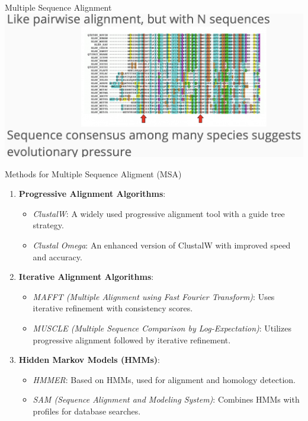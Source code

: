 \documentclass[
  ignorenonframetext,
]{beamer}
\providecommand{\tightlist}{%
  \setlength{\itemsep}{0pt}\setlength{\parskip}{0pt}}
\begin{document}
\begin{frame}{Multiple Sequence Alignment}
\label{multiple-sequence-alignment}
\includegraphics{figs/multiple_align.png}
\end{frame}

\begin{frame}{Methods for Multiple Sequence Aligment (MSA)}
\label{methods-for-multiple-sequence-aligment-msa}
\begin{enumerate}
\tightlist
\item
  \textbf{Progressive Alignment Algorithms}:

  \begin{itemize}
  \tightlist
  \item
    \emph{ClustalW}: A widely used progressive alignment tool with a
    guide tree strategy.
  \item
    \emph{Clustal Omega}: An enhanced version of ClustalW with improved
    speed and accuracy.
  \end{itemize}
\item
  \textbf{Iterative Alignment Algorithms}:

  \begin{itemize}
  \tightlist
  \item
    \emph{MAFFT (Multiple Alignment using Fast Fourier Transform)}: Uses
    iterative refinement with consistency scores.
  \item
    \emph{MUSCLE (Multiple Sequence Comparison by Log-Expectation)}:
    Utilizes progressive alignment followed by iterative refinement.
  \end{itemize}
\item
  \textbf{Hidden Markov Models (HMMs)}:

  \begin{itemize}
  \tightlist
  \item
    \emph{HMMER}: Based on HMMs, used for alignment and homology
    detection.
  \item
    \emph{SAM (Sequence Alignment and Modeling System)}: Combines HMMs
    with profiles for database searches.
  \end{itemize}
\end{enumerate}
\end{frame}
\end{document}
